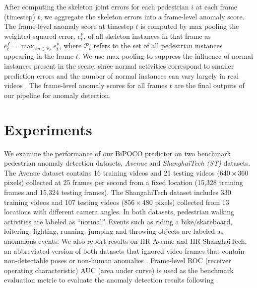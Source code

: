 \documentclass[nohyperref]{article}
\theoremstyle{plain}
\theoremstyle{definition}
\theoremstyle{remark}
\begin{document}
After computing the skeleton joint errors for each pedestrian $i$ at each frame (timestep) $t$, we aggregate the skeleton errors into a frame-level anomaly score. The frame-level anomaly score at timestep $t$ is computed by max pooling the weighted squared error, $e^p_{t}$, of all skeleton instances in that frame as $ e^f_t = \max_{\forall p\in \mathcal{P}_t} e^p_{t}$,
where $\mathcal{P}_t$ refers to the set of all pedestrian instances appearing in the frame $t$. We use max pooling to suppress the influence of normal instances present in the
scene, since normal activities correspond to smaller prediction errors and the number of normal instances can vary largely in real videos  \cite{morais2019learning}. The frame-level
anomaly scores for all frames $t$ are the final outputs of our
pipeline for anomaly detection.










\vspace{-3mm}


\section{Experiments}
\label{sec:experiments}
\vspace{-2mm}
We examine the performance of our BiPOCO predictor on two benchmark pedestrian anomaly detection datasets, \textit{Avenue} \cite{cewu2013} and \textit{ShanghaiTech (ST)} \cite{luo2017revisit} datasets. The Avenue dataset contains 16 training videos and 21 testing videos ($640\times360$ pixels) collected at 25 frames per second from a fixed location (15,328 training frames and 15,324 testing frames). The ShangahiTech dataset includes 330 training videos and 107 testing videos ($856\times480$ pixels) collected from 13 locations with different camera angles. In both datasets, pedestrian walking activities are labeled as ``normal''. Events such as riding a bike/skateboard, loitering, fighting, running, jumping and throwing objects are labeled as anomalous events.  We also report results on HR-Avenue and HR-ShanghaiTech, an abbreviated version of both datasets that ignored video frames that contain  non-detectable poses or non-human anomalies \cite{morais2019learning}. Frame-level ROC (receiver operating characteristic)  AUC (area under curve) is used as the benchmark
evaluation metric to evaluate the anomaly detection results following \cite{hasan2016learning, morais2019learning}.
\end{document}
